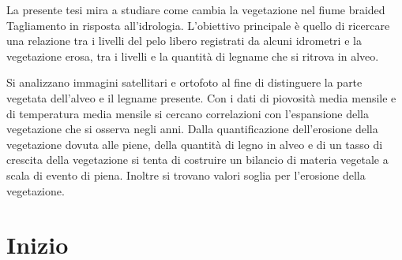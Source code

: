\documentclass[12pt,a4paper,italian,twoside]{scrbook}
\begin{document}

\frontmatter
La presente tesi mira a studiare come cambia la vegetazione nel fiume braided Tagliamento in risposta all'idrologia. 
L'obiettivo principale è quello di ricercare una relazione tra i livelli del pelo libero registrati da alcuni idrometri e la vegetazione erosa, tra i livelli e la quantità di legname che si ritrova in alveo.

Si analizzano immagini satellitari e ortofoto al fine di distinguere la parte vegetata dell'alveo e il legname presente.
Con i dati di piovosità media mensile e di temperatura media mensile si cercano correlazioni con l'espansione della vegetazione che si osserva negli anni.
Dalla quantificazione dell'erosione della vegetazione dovuta alle piene, della quantità di legno in alveo e di un tasso di crescita della vegetazione si tenta di costruire un bilancio di materia vegetale a scala di evento di piena.
Inoltre si trovano valori soglia per l'erosione della vegetazione.


\tableofcontents
\listoffigures
\listoftables


\mainmatter
\chapter{Inizio}
\end{document}
